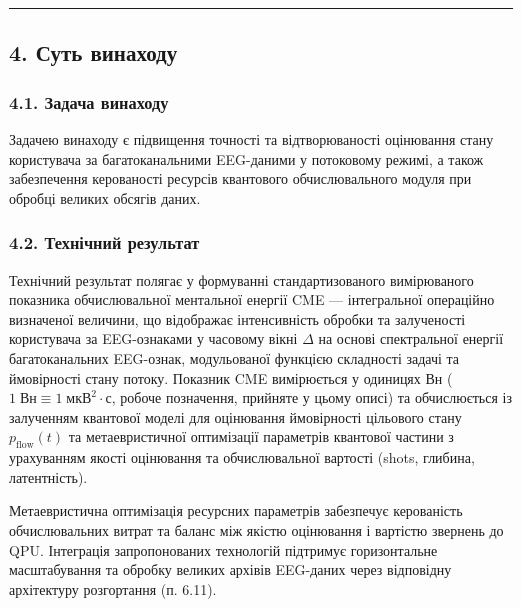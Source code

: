 \documentclass[12pt,a4paper]{article}
\begin{document}
\begin{center}\rule{0.5\linewidth}{0.5pt}\end{center}



\subsection{4. Суть винаходу}\label{ux441ux443ux442ux44c-ux432ux438ux43dux430ux445ux43eux434ux443}



\subsubsection{4.1. Задача винаходу}\label{ux437ux430ux434ux430ux447ux430-ux432ux438ux43dux430ux445ux43eux434ux443}



Задачею винаходу є підвищення точності та відтворюваності оцінювання стану користувача за багатоканальними EEG-даними у потоковому режимі, а також забезпечення керованості ресурсів квантового обчислювального модуля при обробці великих обсягів даних.



\subsubsection{4.2. Технічний результат}\label{ux442ux435ux445ux43dux456ux447ux43dux438ux439-ux440ux435ux437ux443ux43bux44cux442ux430ux442}



Технічний результат полягає у формуванні стандартизованого вимірюваного показника обчислювальної ментальної енергії CME --- інтегральної операційно визначеної величини, що відображає інтенсивність обробки та залученості користувача за EEG-ознаками у часовому вікні \(\Delta\) на основі спектральної енергії багатоканальних EEG-ознак, модульованої функцією складності задачі та ймовірності стану потоку. Показник CME вимірюється у одиницях Вн (\(1\;\text{Вн} \equiv 1\;\text{мкВ}^2 \cdot \text{с}\), робоче позначення, прийняте у цьому описі) та обчислюється із залученням квантової моделі для оцінювання ймовірності цільового стану \(p_{\text{flow}}(t)\) та метаевристичної оптимізації параметрів квантової частини з урахуванням якості оцінювання та обчислювальної вартості (shots, глибина, латентність).



Метаевристична оптимізація ресурсних параметрів забезпечує керованість обчислювальних витрат та баланс між якістю оцінювання і вартістю звернень до QPU. Інтеграція запропонованих технологій підтримує горизонтальне масштабування та обробку великих архівів EEG-даних через відповідну архітектуру розгортання (п. 6.11).
\end{document}
